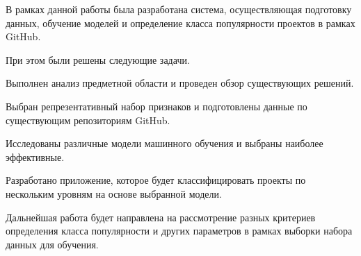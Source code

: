 \newpage
{}

В рамках данной работы была разработана система, осуществляющая подготовку данных, обучение моделей и определение класса популярности проектов в рамках GitHub.

При этом были решены следующие задачи.

\begin{enumerateparen}
    \item Выполнен анализ предметной области и проведен обзор существующих решений.

    \item Выбран репрезентативный набор признаков и подготовлены данные по существующим репозиториям GitHub.

   \item Исследованы различные модели машинного обучения и выбраны наиболее эффективные.

    \item Разработано приложение, которое будет классифицировать проекты по нескольким уровням на основе выбранной модели.
\end{enumerateparen}

Дальнейшая работа будет направлена на рассмотрение разных критериев определения класса популярности и других параметров в рамках выборки набора данных для обучения.